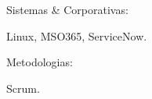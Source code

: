\begin{cventries}
  \cventry
    {} %
    {Sistemas \& Corporativas:} %
    {} %
    {} %
    {
      \begin{cvitems} %
        \item {Linux, MSO365, ServiceNow.}
      \end{cvitems}
    }

  \cventry
    {} %
    {Metodologias:} %
    {} %
    {} %
    {
      \begin{cvitems} %
        \item {Scrum.}
      \end{cvitems}
    }

\end{cventries}
